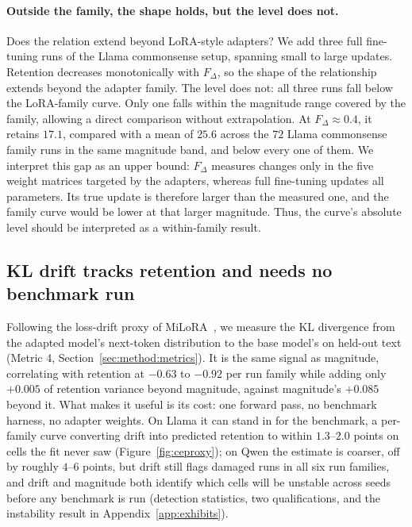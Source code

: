 \documentclass[11pt]{article}
\newcommand{\dw}{F_{\Delta}}
\begin{document}
\paragraph{Outside the family, the shape holds, but the level does not.}
Does the relation extend beyond LoRA-style adapters? We add three full
fine-tuning runs of the Llama commonsense setup, spanning small to large
updates. Retention decreases monotonically with $\dw$, so the shape of the
relationship extends beyond the adapter family. The level does not: all
three runs fall below the LoRA-family curve. Only one falls within the
magnitude range covered by the family, allowing a direct comparison without
extrapolation. At $\dw \approx 0.4$, it retains $17.1$, compared with a mean
of $25.6$ across the $72$ Llama commonsense family runs in the same magnitude
band, and below every one of them. We interpret this gap as an upper bound:
$\dw$ measures changes only in the five weight matrices targeted by the
adapters, whereas full fine-tuning updates all parameters. Its true update
is therefore larger than the measured one, and the family curve would be
lower at that larger magnitude. Thus, the curve's absolute level should be
interpreted as a within-family result.

\subsection{KL drift tracks retention and needs no benchmark run}\label{sec:results:rq3}
Following the loss-drift proxy of
MiLoRA~\citep{wang2024milora}, we measure the KL divergence from the
adapted model's next-token distribution to the base model's on held-out
text (Metric 4, Section~\ref{sec:method:metrics}). It is the same signal
as magnitude, correlating with retention at $-0.63$ to $-0.92$ per run
family while adding only $+0.005$ of retention variance beyond magnitude,
against magnitude's $+0.085$ beyond it. What makes it useful is its cost:
one forward pass, no benchmark harness, no adapter weights. On Llama it
can stand in for the benchmark, a per-family curve converting drift into
predicted retention to within $1.3$--$2.0$ points on cells the fit never
saw (Figure~\ref{fig:ceproxy}); on Qwen the estimate is coarser, off by
roughly $4$--$6$ points, but drift still flags damaged runs in all six run
families, and drift and magnitude both identify which cells will be
unstable across seeds before any benchmark is run (detection statistics,
two qualifications, and the instability result in
Appendix~\ref{app:exhibits}).
\end{document}
